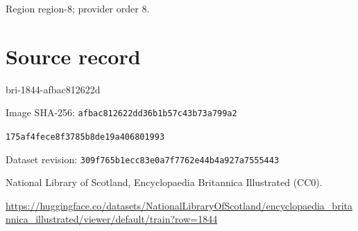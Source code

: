 \documentclass[11pt]{article}
\begin{document}
{\scriptsize\color{gray} Region region-8; provider order 8.\par}
\medskip
\newpage\section*{Source record}
bri-1844-afbac812622d\par
Image SHA-256: \texttt{afbac812622dd36b1b57c43b73a799a2}\par\texttt{175af4fece8f3785b8de19a406801993}\par
Dataset revision: \texttt{309f765b1ecc83e0a7f7}\texttt{762e44b4a927a7555443}\par
National Library of Scotland, Encyclopaedia Britannica Illustrated (CC0).\par
\url{https://huggingface.co/datasets/NationalLibraryOfScotland/encyclopaedia_britannica_illustrated/viewer/default/train?row=1844}
\end{document}
